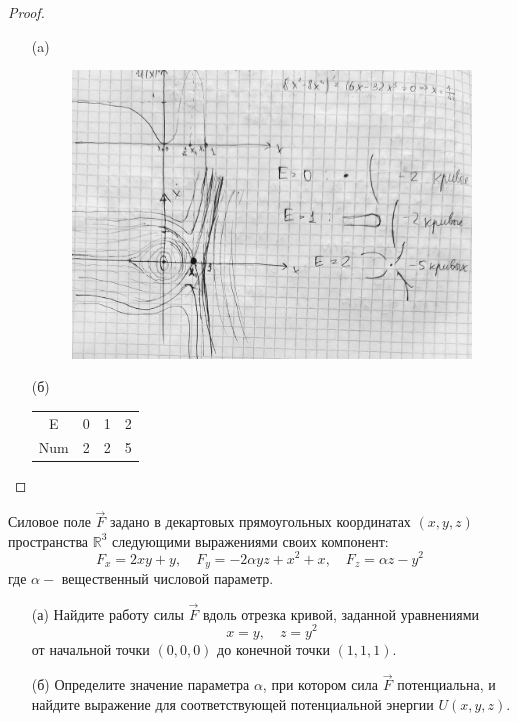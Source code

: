 \begin{proof}
\begin{itemize}
\item[(a)]
\item[]
    \begin{figure}[h!]
    \includegraphics[scale=0.55]{IMG/prb_2v1}
    \end{figure}
\item[(б)]
    \begin{flushleft}
    \begin{tabular}{ c | c c c }
    E & 0 & 1 & 2\\
    Num & 2 & 2 & 5
    \end{tabular}
    \end{flushleft}
\end{itemize}
\end{proof}
\vskip 0.6in




\begin{prob}
Силовое поле $\vec{F}$ задано в декартовых прямоугольных координатах $(x, y, z)$ пространства $\mathbb{R}^3$ следующими выражениями своих компонент:
$$
F_x=2 x y+y, \quad F_y=-2 \alpha y z+x^2+x, \quad F_z=\alpha z-y^2
$$
где $\alpha-$ вещественный числовой параметр.
\begin{itemize}
\item[]
\item[(а)] Найдите работу силы $\vec{F}$ вдоль отрезка кривой, заданной уравнениями
$$
x=y, \quad z=y^2
$$
от начальной точки $\left(0,0,0\right)$ до конечной точки $\left(1,1,1\right)$.
\item[(б)] Определите значение параметра $\alpha$, при котором сила $\vec{F}$ потенциальна, и найдите выражение для соответствующей потенциальной энергии $U(x, y, z)$.
\end{itemize}
\end{prob}

